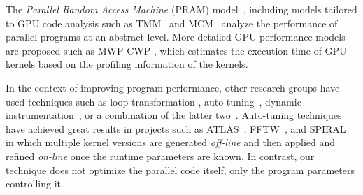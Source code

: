 The {\em Parallel Random Access Machine}
(PRAM) model~\cite{DBLP:journals/siamcomp/StockmeyerV84,Gibbons:1989:MPP:72935.72953},
including models tailored to GPU code analysis
such as 
TMM~\cite{DBLP:journals/fgcs/MaAC14} and  MCM~\cite{DBLP:conf/parco/HaqueMX15}
analyze the performance of parallel programs at an abstract level.
More detailed GPU performance models are proposed such as MWP-CWP 
\cite{DBLP:conf/isca/HongK09,DBLP:conf/ppopp/SimDKV12}, which estimates the execution time of GPU kernels based on the profiling information of the kernels. 


In the context of improving {\cuda} program performance, other research groups have
used techniques such as loop transformation \cite{DBLP:conf/ics/BaskaranBKRRS08},
auto-tuning~\cite{grauer2012auto,Khan:2013:SAC:2400682.2400690,DBLP:books/daglib/p/SatoTKK10,DBLP:conf/icpp/KurzakTGAD19},
dynamic instrumentation~\cite{kistler2003continuous}, or
a combination of the latter two~\cite{song2015automated}.
Auto-tuning techniques have achieved great results
in projects such as 
ATLAS~\cite{DBLP:conf/ppsc/WhaleyD99},
FFTW~\cite{DBLP:conf/icassp/FrigoJ98}, and
SPIRAL~\cite{DBLP:journals/ijhpca/PuschelMSXJPVJ04}
in which multiple kernel versions are generated 
\textit{off-line} and then applied and refined  \textit{on-line}
once the runtime parameters are known.
In contrast, our technique does not optimize the parallel code itself, 
only the program parameters controlling it.

